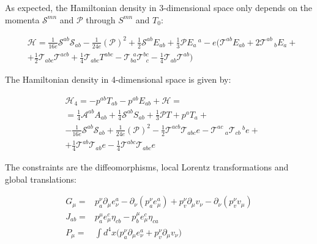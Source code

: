 \documentclass[11pt]{book}
\begin{document}
As expected, the Hamiltonian density in 3-dimensional space only depends
on the momenta \(\mathcal{S}^{m n}\) and \(\mathcal{P}\) through
\(S^{m n}\) and \(T_{0}\):

\begin{equation}\begin{aligned}
    &\mathcal{H}=\frac{1}{16 e}\mathcal{S}^{a b} \mathcal{S}_{a b} - \frac{1}{24 e} (\mathcal{P})^2
    +\frac{1}{2}\mathcal{S}^{a b} E_{a b}
    +\frac{1}{3}\mathcal{P} E_{a}\,^{a}-e\biggl(\mathcal{T}^{a b} E_{a b}+2 \mathcal{T}^{a b}\,_{b} E_{a}+\\ 
    &+\frac{1}{2}\mathcal{T}_{a b c} \mathcal{T}^{a c b} + \frac{1}{4} \mathcal{T}_{a b c} T^{a b c}-\mathcal{T}_{b a}^{\ \ a} \mathcal{T}^{b c}_{\ \ c}-\frac{1}{4}\mathcal{T}_{a b} \mathcal{T}^{a b}\biggr)\end{aligned}\end{equation}

The Hamiltonian density in 4-dimensional space is given by:

\begin{equation}\begin{aligned}
    &\mathcal{H}_4=-p^{a b}T_{a b}-p^{a b}E_{a b}+\mathcal{H}=\\
    &=\frac{1}{4}\mathcal{A}^{a b} A_{a b}+\frac{1}{4}\mathcal{S}^{a b} S_{a b}+\frac{1}{3} \mathcal{P}T+ p^{a} T_{a}+\\
    &- \frac{1}{16 e}\mathcal{S}^{a b} \mathcal{S}_{a b}+\frac{1}{24 e}(\mathcal{P})^2- \frac{1}{2}\mathcal{T}^{a c b} \mathcal{T}_{a b c} e
    -\mathcal{T}^{a c}\,_{a} \mathcal{T}_{c b}\,^{b} e+\\
    &+\frac{1}{4} \mathcal{T}^{a b} \mathcal{T}_{a b} e - \frac{1}{4} \mathcal{T}^{a b c} \mathcal{T}_{a b c} e\end{aligned}\end{equation}

The constraints are the diffeomorphisms, local Lorentz transformations
and global translations:

\begin{equation}\begin{aligned}
    G_\mu=&p^{\nu}_{a} \partial_{\mu} e_{\nu}^{a}-\partial_{\nu}(p^{\nu}_{a} e_{\mu}^{a})+p^{\nu}_{v} \partial_{\mu} v_{\nu}-\partial_{\nu}(p^{\nu}_{v} v_{\mu})\\
    J_{a b}=&p^{\mu}_{a} e_{\mu}^{c}\eta_{c b}-p^{\mu}_{b} e_{\mu}^{c}\eta_{c a}\\
    P_\mu=&\int d^4x \biggl(p^{\nu}_{a} \partial_{\mu} e_{\nu}^{a}+p^{\nu}_{v} \partial_{\mu} v_{\nu}\biggr)\end{aligned}\end{equation}
\end{document}

